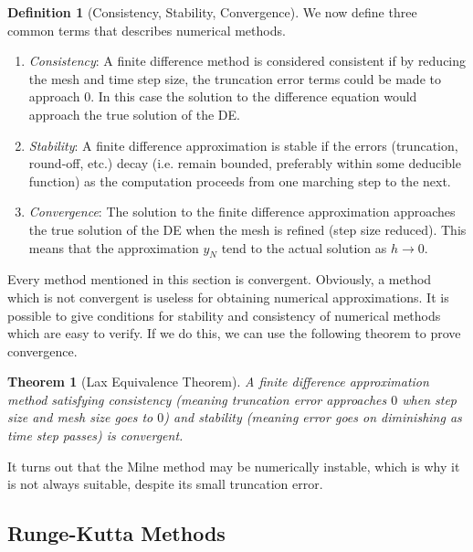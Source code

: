 \documentclass{article}
\newtheorem{theorem}{Theorem}[section]
\theoremstyle{remark}
\theoremstyle{definition}
\newtheorem{definition}{Definition}[section]
\begin{document}
    \begin{definition}[Consistency, Stability, Convergence]
    We now define three common terms that describes numerical methods. 
    \begin{enumerate}
        \item \textit{Consistency}: A finite difference method is considered consistent if by reducing the mesh and time step size, the truncation error terms could be made to approach $0$. In this case the solution to the difference equation would approach the true solution of the DE. 
        \item \textit{Stability}: A finite difference approximation is stable if the errors (truncation, round-off, etc.) decay (i.e. remain bounded, preferably within some deducible function) as the computation proceeds from one marching step to the next. 
        \item \textit{Convergence}: The solution to the finite difference approximation approaches the true solution of the DE when the mesh is refined (step size reduced). This means that the approximation $y_N$ tend to the actual solution as $h \rightarrow 0$. 
    \end{enumerate}
    \end{definition}

    Every method mentioned in this section is convergent. Obviously, a method which is not convergent is useless for obtaining numerical approximations. It is possible to give conditions for stability and consistency of numerical methods which are easy to verify. If we do this, we can use the following theorem to prove convergence. 

    \begin{theorem}[Lax Equivalence Theorem]
    A finite difference approximation method satisfying consistency (meaning truncation error approaches $0$ when step size and mesh size goes to $0$) and stability (meaning error goes on diminishing as time step passes) is convergent. 
    \end{theorem}

    It turns out that the Milne method may be numerically instable, which is why it is not always suitable, despite its small truncation error. 

  \subsection{Runge-Kutta Methods}
\end{document}

